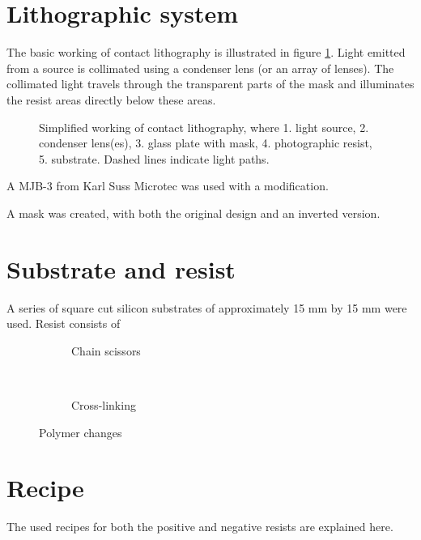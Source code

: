 \section*{Lithographic system}
The basic working of contact lithography is illustrated in figure \ref{fig:contact-litho}. Light emitted from a source is collimated using a condenser lens (or an array of lenses). The collimated light travels through the transparent parts of the mask and illuminates the resist areas directly below these areas. 
\begin{figure}[H]
	\centering
	\resizebox{0.7\linewidth}{!}{}
	\caption{Simplified working of contact lithography, where 1. light source, 2. condenser lens(es), 3. glass plate with mask, 4. photographic resist, 5. substrate. Dashed lines indicate light paths.}
	\label{fig:contact-litho}
\end{figure} A MJB-3 from Karl Suss Microtec was used with a modification. 

A mask was created, with both the original design and an inverted version.  

\section*{Substrate and resist}
A series of square cut silicon substrates of approximately 15 mm by 15 mm were used. Resist consists of 

\begin{figure}[H]
	\centering
	\begin{subfigure}[t]{0.45\linewidth}
		\centering
		\resizebox{\linewidth}{!}{}
		\caption{Chain scissors}
		\label{fig:chainscissor}
	\end{subfigure}
	~
	\begin{subfigure}[t]{0.45\linewidth}
		\centering
		\resizebox{\linewidth}{!}{}
		\caption{Cross-linking}
		\label{fig:crosslinking}
	\end{subfigure}
	\caption{Polymer changes}
	\label{fig:polymers}
\end{figure}


\section*{Recipe}
The used recipes for both the positive and negative resists are explained here.
